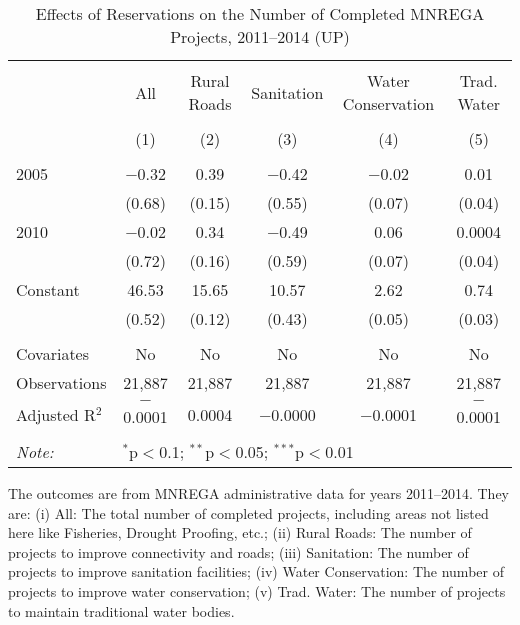 \begin{table}[!htbp]
\centering
\begin{threeparttable}

  \caption{Effects of Reservations on the Number of Completed MNREGA Projects, 2011--2014 (UP)} 
  \label{main_mnrega_up_2005_2010} 
\scriptsize 
\begin{tabular}{@{\extracolsep{0pt}}lccccc} 
\\[-1.8ex]\hline 
\hline \\[-1.8ex] 
 & All & Rural Roads & Sanitation & Water Conservation & Trad. Water \\ 
\\[-1.8ex] & (1) & (2) & (3) & (4) & (5)\\ 
\hline \\[-1.8ex] 
 2005 & $-$0.32 & 0.39 & $-$0.42 & $-$0.02 & 0.01 \\ 
  & (0.68) & (0.15) & (0.55) & (0.07) & (0.04) \\ 
  2010 & $-$0.02 & 0.34 & $-$0.49 & 0.06 & 0.0004 \\ 
  & (0.72) & (0.16) & (0.59) & (0.07) & (0.04) \\ 
  Constant & 46.53 & 15.65 & 10.57 & 2.62 & 0.74 \\ 
  & (0.52) & (0.12) & (0.43) & (0.05) & (0.03) \\ 
 \hline \\[-1.8ex] 
Covariates & No & No & No & No & No \\ 
Observations & 21,887 & 21,887 & 21,887 & 21,887 & 21,887 \\ 
Adjusted R$^{2}$ & $-$0.0001 & 0.0004 & $-$0.0000 & $-$0.0001 & $-$0.0001 \\ 
\hline 
\hline \\[-1.8ex] 
\textit{Note:}  & \multicolumn{5}{l}{$^{*}$p$<$0.1; $^{**}$p$<$0.05; $^{***}$p$<$0.01} \\ 
\end{tabular} 
\begin{tablenotes}[flushleft]
\scriptsize
\item The outcomes are from MNREGA administrative data for years 2011--2014. They are: 
(i) All: The total number of completed projects, including areas not listed here like Fisheries, Drought Proofing, etc.;
(ii) Rural Roads: The number of projects to improve connectivity and roads;
(iii) Sanitation: The number of projects to improve sanitation facilities;
(iv) Water Conservation: The number of projects to improve water conservation;
(v) Trad. Water: The number of projects to maintain traditional water bodies.
\end{tablenotes}
\end{threeparttable}
\end{table}
